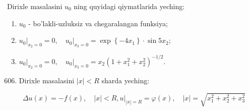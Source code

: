 \documentclass[10pt]{article}
\begin{document}
Dirixle masalasini $u_{0}$ ning quyidagi qiymatlarida yeching:

\begin{enumerate}
  \item $u_{0}$ - bo'lakli-uzluksiz va chegaralangan funksiya;
  \item $\left.u_{0}\right|_{x_{2}=0}=0,\left.\quad u_{0}\right|_{x_{3}=0}=\exp \left\{-4 x_{1}\right\} \cdot \sin 5 x_{2}$;
  \item $\left.u_{0}\right|_{x_{2}=0}=0,\left.\quad u_{0}\right|_{x_{3}=0}=x_{2}\left(1+x_{1}^{2}+x_{2}^{2}\right)^{-1 / 2}$.
\end{enumerate}

\begin{enumerate}
  \setcounter{enumi}{605}
  \item Dirixle masalasini $|x|<R$ sharda yeching:
\end{enumerate}

$$
\Delta u(x)=-f(x), \quad|x|<R,\left.u\right|_{|x|=R}=\varphi(x), \quad|x|=\sqrt{x_{1}^{2}+x_{2}^{2}+x_{3}^{2}}
$$
\end{document}
